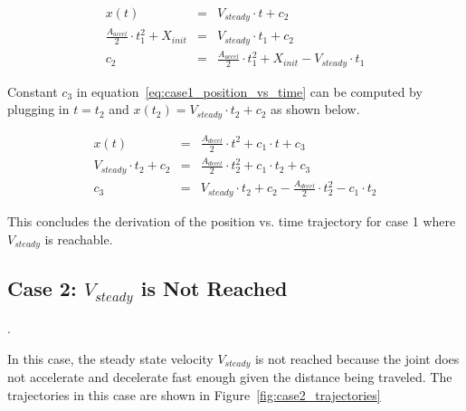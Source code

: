 \documentclass[11pt]{article} %
\begin{document}
\begin{eqnarray}
x(t) & = & V_{steady} \cdot t + c_2 \nonumber \\
 \frac{A_{accel}}{2} \cdot t_1^2 + X_{init} & = & V_{steady} \cdot t_1 + c_2 \nonumber\\
 c_2 & = &   \frac{A_{accel}}{2} \cdot t_1^2 + X_{init} - V_{steady} \cdot t_1
 \end{eqnarray}

\noindent Constant $c_3$ in equation~\ref{eq:case1_position_vs_time} can be computed by plugging in $t = t_2$ and $x(t_2) = V_{steady} \cdot t_2 + c_2$ as shown below.

\begin{eqnarray}
x(t) & = & \frac{A_{decel}}{2} \cdot t^{2} + c_1 \cdot t + c_3 \nonumber \\
V_{steady} \cdot t_2 + c_2 & = & \frac{A_{decel}}{2} \cdot t_2^2 + c_1 \cdot t_2 + c_3 \nonumber \\
 c_3 & = & V_{steady} \cdot t_2 + c_2 - \frac{A_{decel}}{2} \cdot t_2^2 - c_1 \cdot t_2 
  \end{eqnarray}

\noindent This concludes the derivation of the position vs. time trajectory for case 1 where $V_{steady}$ is reachable.

\subsection{Case 2: $V_{steady}$ is Not Reached} \label{sec:unable_to_reach_V_steady}.

In this case, the steady state velocity $V_{steady}$ is not reached because the joint does not accelerate and decelerate fast enough given the distance being traveled. The trajectories in this case are shown in Figure~\ref{fig:case2_trajectories}
\end{document}
